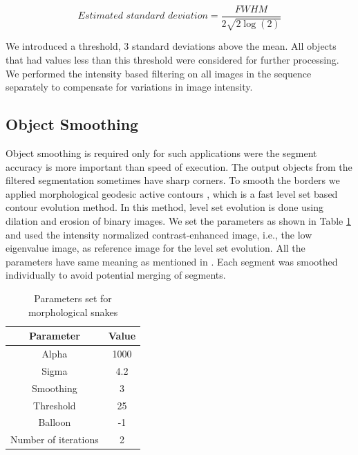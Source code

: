 \documentclass[journal]{IEEEtran}
\begin{document}
\begin{equation}
\textit{Estimated standard deviation} = \frac{FWHM}{2 \sqrt{2\log(2)}}
\end{equation}

We introduced a threshold, $3$ standard deviations above the mean. All objects that had values less than this threshold were considered for further processing. We performed the intensity based filtering on all images in the sequence separately to compensate for variations in image intensity.

\subsection{Object Smoothing}

Object smoothing is required only for such applications were the segment accuracy is more important than speed of execution. The output objects from the filtered segmentation sometimes have sharp corners. To smooth the borders we applied morphological geodesic active contours \cite {marquezmorphological2014}, which is a fast level set based contour evolution method. In this method, level set evolution is done using dilation and erosion of binary images. We set the parameters as shown in Table \ref{tab:paramsnake} and used the intensity normalized contrast-enhanced image, i.e., the low eigenvalue image, as reference image for the level set evolution. All the parameters have same meaning as mentioned in \cite {marquezmorphological2014}.  Each segment was smoothed individually to avoid potential merging of segments. 
\begin{table}[t]

	\caption{Parameters set for morphological snakes}
	\label{tab:paramsnake}
	\centering
	
	\begin{tabular}{c c }
	\hline
	\hline
	Parameter & Value \\
	\hline
	Alpha & 1000\\
	Sigma & 4.2 \\
	Smoothing & 3 \\
	Threshold & 25\\
	Balloon & -1 \\
	Number of iterations & 2\\
	\hline
	\hline
	\end{tabular}

\end{table}
\end{document}
